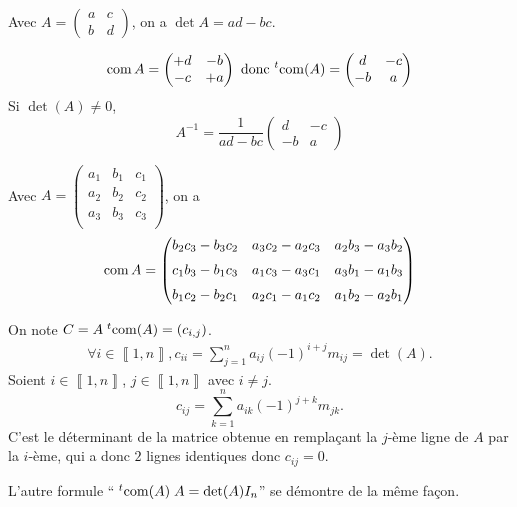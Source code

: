 \begin{exm}
	Avec $A = \begin{pmatrix}
		a&c\\
		b&d
	\end{pmatrix}$, on a $\det A = ad - bc$.

	\[
		\operatorname{com} A = \begin{pmatrix}
			+d&-b\\
			-c&+a
		\end{pmatrix} \text{ donc } {}^t\! \operatorname{com}(A) = \begin{pmatrix}
			d & -c\\
			-b & a
		\end{pmatrix}
	\] Si $\det(A) \neq 0$, \[
		A^{-1} = \frac{1}{ad - bc} \begin{pmatrix}
			d&-c\\
			-b&a
		\end{pmatrix}
	\]
\end{exm}

\begin{exm}
	Avec $A = \begin{pmatrix}
		a_1&b_1&c_1\\
		a_2&b_2&c_2\\
		a_3&b_3&c_3\\
	\end{pmatrix}$, on a \[
		\operatorname{com} A = \begin{pmatrix}
			b_2c_3-b_3c_2 & a_3c_2-a_2c_3 & a_2b_3-a_3b_2\\[2mm]
			c_1b_3-b_1c_3 & a_1c_3-a_3c_1 & a_3b_1-a_1 b_3\\[2mm]
			b_1c_2-b_2c_1 & a_2c_1-a_1c_2 & a_1b_2-a_2b_1
		\end{pmatrix}
	\]
\end{exm}

\begin{prv}
	On note $C = A\; {}^t\!\operatorname{com}(A) = (c_{i,j})$.
	\begin{align*}
		\forall i \in \left\llbracket 1,n \right\rrbracket,
		c_{ii} = \sum_{j=1}^n a_{ij} (-1)^{i+j} m_{ij} = \det(A).
	\end{align*}
	Soient $i \in \left\llbracket 1,n \right\rrbracket$, $j \in \left\llbracket 1,n \right\rrbracket$ avec $i \neq j$. \[
		c_{ij} = \sum_{k=1}^n a_{ik}(-1)^{j+k} m_{jk}.
	\] C'est le déterminant de la matrice obtenue en rempla\c cant la $j$-ème ligne de $A$ par la $i$-ème, qui a donc $2$ lignes identiques donc $c_{ij} = 0$.

	L'autre formule ``$\;{}^t\!\operatorname{com}(A)\;A = \operatorname{det}(A)I_n$'' se démontre de la même fa\c con.
\end{prv}

